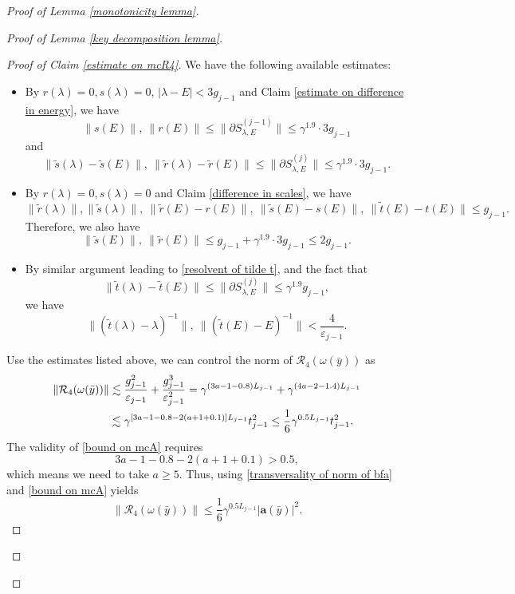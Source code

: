 \documentclass[11pt,reqno,UTF8,twoside]{amsart}
\newcommand{\ts}{\tilde{s}}
\newcommand{\tr}{\tilde{r}}
\renewcommand{\tt}{\tilde{t}}
\newcommand{\bfa}{\mathbf{a}}
\newcommand{\mcR}{\mathcal{R}}
\newcommand{\wtlambda}{\widetilde{\lambda}}
\newcommand{\partialSj}{\partial {S}^{(j)}}
\newcommand{\partialSjminusone}{\partial {S}^{(j-1)}}
\newtheorem{rmk}{\bf Remark}[section]
\theoremstyle{definition}
\numberwithin{equation}{section}
\begin{document}
\begin{proof}[Proof of Lemma \ref{monotonicity lemma}]
\begin{proof}[Proof of Lemma \ref{key decomposition lemma}]
\begin{proof}[Proof of Claim \ref{estimate on mcR4}]
We have the following  available estimates:
\begin{itemize} 
 \item By $r(\lambda)=0,s(\lambda)=0$, $|\lambda-E|<3g_{j-1}$ and Claim \ref{estimate on difference in energy}, we have 
             \[\| s(E) \|,\ \| r(E)\| \leq \| \partialSjminusone_{\lambda,E}\|\leq \gamma^{1.9} \cdot 3g_{j-1} \]
             and 
           \[\| \ts(\lambda)-\ts(E) \|,\ \| \tr(\lambda)-\tr(E)\| \leq \| \partialSj_{\lambda,E}\|\leq \gamma^{1.9} \cdot 3g_{j-1} .\]
  \item By $r(\lambda)=0,s(\lambda)=0$ and Claim \ref{difference in scales}, we have 
               \[\|\tr(\lambda)\|, \|\ts(\lambda)\|,\   \| \tr(E)-r(E)\|, \ \| \ts(E)-s(E) \|,\  \|\tt(E)-t(E)\| \leq g_{j-1}.\] 
       Therefore, we also have 
       \[  \| \ts(E) \|,\ \| \tr(E)\| \leq g_{j-1}+ \gamma^{1.9} \cdot 3g_{j-1}\leq 2 g_{j-1}.   \]
  \item By similar argument leading  to \eqref{resolvent of tilde t}, and the fact that 
      \[ \| \tt(\lambda)-\tt(E)\| \leq \| \partialSj_{\lambda,E}\|\leq \gamma^{1.9} g_{j-1},\]
        we have  
        \[\|(\tt(\lambda)-\lambda)^{-1} \|, \ \|(\tt(E)-E)^{-1} \| <\frac{4}{\varepsilon_{j-1}}. \]
\end{itemize}
Use the estimates listed above, we can control  the norm of $\mcR_4(\omega(\bar{y}))$ as 
\begin{align}\label{bound on mcA}
  \notag \|\mcR_4(\omega(\bar{y}))\| &\lesssim \frac{g_{j-1}^2 }{\varepsilon_{j-1}} + \frac{g_{j-1}^3 }{\varepsilon_{j-1}^2} = \gamma^{(3a-1-0.8)L_{j-1}} +\gamma^{(4a-2-1.4)L_{j-1}}\\
    &\lesssim \gamma^{[3a-1-0.8-2(a+1+0.1)]L_{j-1}}t^2_{j-1} \leq \frac{1}{6}\gamma^{0.5L_{j-1}} t^2_{j-1}.
\end{align}
The validity of \eqref{bound on mcA} requires 
\begin{equation}\label{range of a}
  3a-1-0.8-2(a+1+0.1)>0.5,
\end{equation}
which means we need to take $a\geq 5$. Thus, using \eqref{transversality of norm of bfa} and \eqref{bound on mcA} yields 
\[\| \mcR_4(\omega(\bar{y})) \|\leq \frac{1}{6}\gamma^{0.5L_{j-1}} |\bfa(\bar{y}) |^2 .\]

\end{proof}




\end{proof}
\end{proof}
\end{document}
